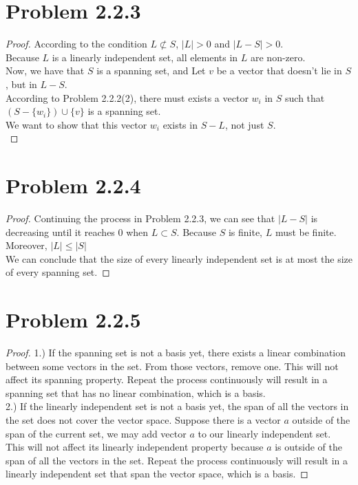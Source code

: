 \documentclass[12pt]{article}
\begin{document}
\section{Problem 2.2.3}

\begin{proof}
	According to the condition $L \not\subset S$, $|L|>0$ and $|L-S|>0$.
 \\ Because $L$ is a linearly independent set, all elements in $L$ are non-zero.
 \\ Now, we have that $S$ is a spanning set, and Let $v$ be a vector that doesn't lie in $S$, but in $L-S$.
 \\According to Problem 2.2.2(2), there must exists a vector $w_i$ in $S$ such that $(S-\{w_i\}) \cup \{v\}$ is a spanning set.
 \\We want to show that this vector $w_i$ exists in $S-L$, not just $S$.
 \\
 
\end{proof}

\newpage 

\section{Problem 2.2.4}

\begin{proof}
	Continuing the process in Problem 2.2.3, we can see that $|L-S|$ is decreasing until it reaches $0$ when $L \subset S$. Because $S$ is finite, $L$ must be finite. Moreover, $|L|\leq|S|$
 \\We can conclude that the size of every linearly independent set is at most the size of every spanning set.
\end{proof}

\newpage 

\section{Problem 2.2.5}

\begin{proof}
1.) If the spanning set is not a basis yet, there exists a linear combination between some vectors in the set. From those vectors, remove one. This will not affect its spanning property. Repeat the process continuously will result in a spanning set that has no linear combination, which is a basis.
\\ 2.) If the linearly independent set is not a basis yet, the span of all the vectors in the set does not cover the vector space. Suppose there is a vector $a$ outside of the span of the current set, we may add vector $a$ to our linearly independent set. This will not affect its linearly independent property because $a$ is outside of the span of all the vectors in the set. Repeat the process continuously will result in a linearly independent set that span the vector space, which is a basis.
\end{proof}
\end{document}
